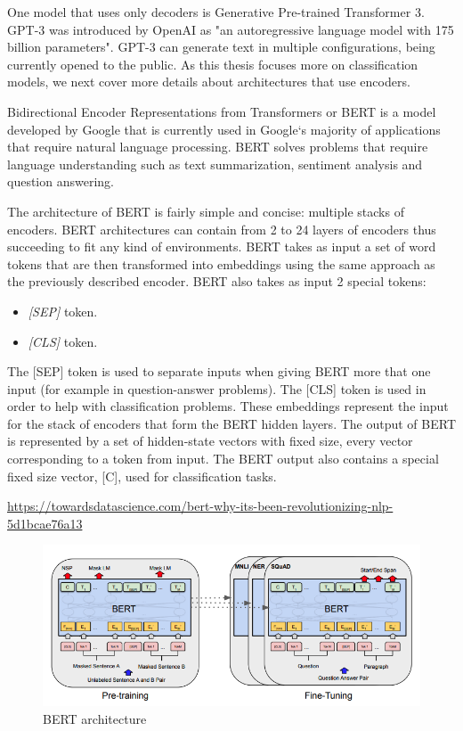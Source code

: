 \documentclass[12pt,a4paper]{report}
\begin{document}
One model that uses only decoders is Generative Pre-trained Transformer 3. GPT-3 was introduced by OpenAI \citep{brown2020language} as "an autoregressive language model with 175 billion parameters". GPT-3 can generate text in multiple configurations, being currently opened to the public. As this thesis focuses more on classification models, we next cover more details about architectures that use encoders.



Bidirectional Encoder Representations from Transformers or BERT is a model developed by Google \citep{devlin2019bert} that is currently used in Google`s majority of applications that require natural language processing. BERT solves problems that require language understanding such as text summarization, sentiment analysis and question answering. 

The architecture of BERT is fairly simple and concise: multiple stacks of encoders. BERT architectures can contain from 2 to 24 layers of encoders thus succeeding to fit any kind of environments. BERT takes as input a set of word tokens that are then transformed into embeddings using the same approach as the previously described encoder. BERT also takes as input 2 special tokens:
\begin{itemize}
    \item \textit{[SEP]} token.
    \item \textit{[CLS]} token.
\end{itemize}
The [SEP] token is used to separate inputs when giving BERT more that one input (for example in question-answer problems). The [CLS] token is used in order to help with classification problems. These embeddings represent the input for the stack of encoders that form the BERT hidden layers. The output of BERT is represented by a set of hidden-state vectors with fixed size, every vector corresponding to a token from input. The BERT output also contains a special fixed size vector, [C], used for classification tasks.

\urldef{\urlBERT}\url{https://towardsdatascience.com/bert-why-its-been-revolutionizing-nlp-5d1bcae76a13}
\begin{figure}[H]
\centering
\includegraphics[width=15cm]{pics/bert.png}
  \caption[BERT architecture]{BERT architecture\footnotemark}
  \label{fig:BERT}
\end{figure}
\footnotetext{\urlBERT}
\end{document}
